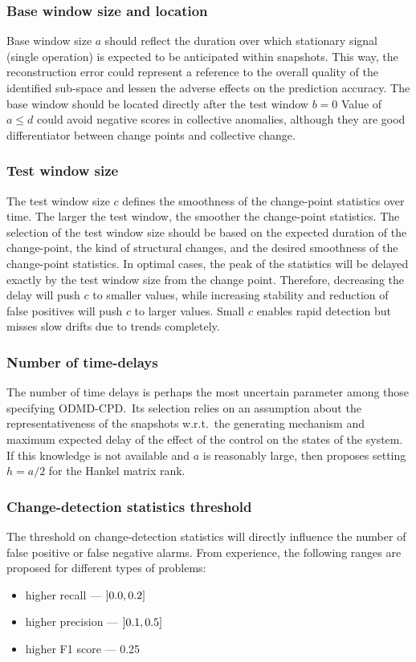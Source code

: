 \subsubsection{Base window size and location}
Base window size \(a\) should reflect the duration over which stationary signal (single operation) is expected to be anticipated within snapshots. This way, the reconstruction error could represent a reference to the overall quality of the identified sub-space and lessen the adverse effects on the prediction accuracy. The base window should be located directly after the test window \(b = 0\)
Value of \(a \leq d\) could avoid negative scores in collective anomalies, although they are good differentiator between change points and collective change.

\subsubsection{Test window size}
The test window size \(c\) defines the smoothness of the change-point statistics over time. The larger the test window, the smoother the change-point statistics. The selection of the test window size should be based on the expected duration of the change-point, the kind of structural changes, and the desired smoothness of the change-point statistics. In optimal cases, the peak of the statistics will be delayed exactly by the test window size from the change point. Therefore, decreasing the delay will push \(c\) to smaller values, while increasing stability and reduction of false positives will push \(c\) to larger values. Small \(c\) enables rapid detection but misses slow drifts due to trends completely.

\subsubsection{Number of time-delays}
The number of time delays is perhaps the most uncertain parameter among those specifying ODMD-CPD.~Its selection relies on an assumption about the representativeness of the snapshots w.r.t.~the generating mechanism and maximum expected delay of the effect of the control on the states of the system. If this knowledge is not available and \(a\) is reasonably large, then \citet{Moskvina2003} proposes setting \(h = a / 2\) for the Hankel matrix rank.

\subsubsection{Change-detection statistics threshold}
The threshold on change-detection statistics will directly influence the number of false positive or false negative alarms. From experience, the following ranges are proposed for different types of problems:
\begin{itemize}
	\item higher recall --- \( \interval[open left]{0.0}{0.2} \)
	\item higher precision --- \( \interval[open left]{0.1}{0.5} \)
	\item higher F1 score --- 0.25
\end{itemize}
